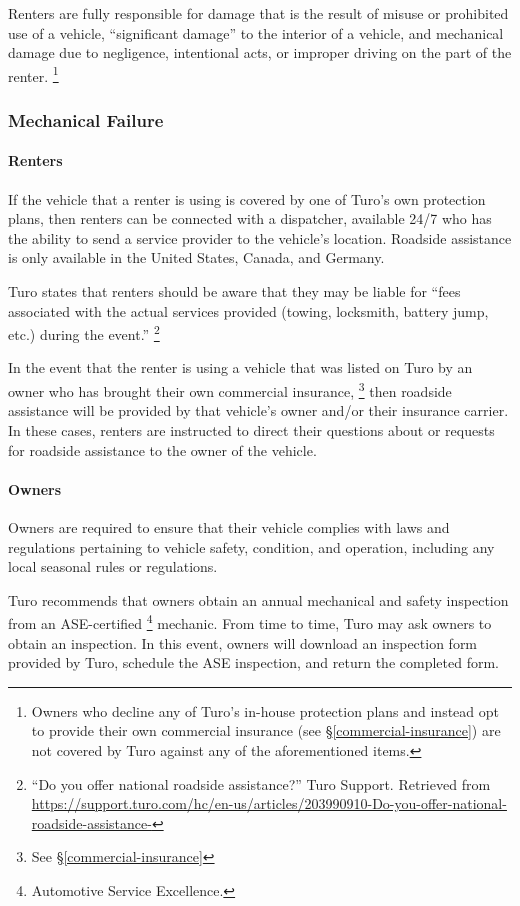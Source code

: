 \documentclass[review,12pt]{elsarticle}
\begin{document}
    Renters are fully responsible for damage that is the result of misuse or prohibited use of a vehicle, ``significant damage'' to the interior of a vehicle, and mechanical damage due to negligence, intentional acts, or improper driving on the part of the renter.
      \footnote{Owners who decline any of Turo's in-house protection plans and instead opt to provide their own commercial insurance (see \S\ref{commercial-insurance}) are not covered by Turo against any of the aforementioned items.
      }

  \subsubsection{Mechanical Failure}
    \paragraph{Renters}
    If the vehicle that a renter is using is covered by one of Turo's own protection plans, then renters can be connected with a dispatcher, available 24/7 who has the ability to send a service provider to the vehicle's location. Roadside assistance is only available in the United States, Canada, and Germany.

    Turo states that renters should be aware that they may be liable for ``fees associated with the actual services provided (towing, locksmith, battery jump, etc.) during the event.''
    \footnote{``Do you offer national roadside assistance?'' Turo Support. Retrieved from \url{https://support.turo.com/hc/en-us/articles/203990910-Do-you-offer-national-roadside-assistance-}
    }

    In the event that the renter is using a vehicle that was listed on Turo by an owner who has brought their own commercial insurance,
    \footnote{See \S\ref{commercial-insurance}
    }
    then roadside assistance will be provided by that vehicle's owner and/or their insurance carrier. In these cases, renters are instructed to direct their questions about or requests for roadside assistance to the owner of the vehicle.

    \paragraph{Owners}
    Owners are required to ensure that their vehicle complies with laws and regulations pertaining to vehicle safety, condition, and operation, including any local seasonal rules or regulations.

    Turo recommends that owners obtain an annual mechanical and safety inspection from an ASE-certified
    \footnote{Automotive Service Excellence.
    }
    mechanic. From time to time, Turo may ask owners to obtain an inspection. In this event, owners will download an inspection form provided by Turo, schedule the ASE inspection, and return the completed form.
\end{document}
